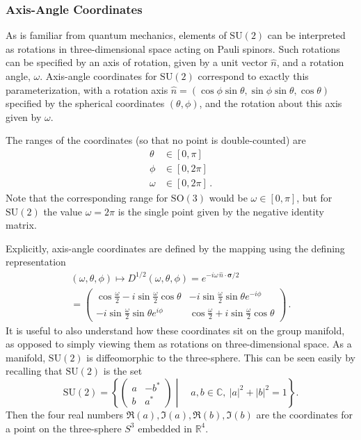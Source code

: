 \documentclass[reprint,superscriptaddress,pra,nofootinbib,preprintnumbers,floatfix]{revtex4-1}
\providecommand{\sutwo}{$\mathrm{SU}(2)$\xspace}
\providecommand{\sothree}{$\mathrm{SO}(3)$\xspace}
\begin{document}
\subsubsection*{Axis-Angle Coordinates}

As is familiar from quantum mechanics, elements of \sutwo can be interpreted as rotations in three-dimensional space acting on Pauli spinors. 
%
Such rotations can be specified by an axis of rotation, given by a unit vector $\hat n$, and a rotation angle, $\omega$. 
%
Axis-angle coordinates for \sutwo correspond to exactly this parameterization, with a rotation axis $\hat{n} = (\cos\phi \sin\theta, \sin\phi\sin\theta, \cos\theta)$ specified by the spherical coordinates $(\theta,\phi)$, and the rotation about this axis given by $\omega$.



The ranges of the coordinates (so that no point is double-counted) are
%
\begin{equation}
\begin{split}
    \theta &\in [0,\pi] \\
    \phi &\in [0,2\pi] \\
    \omega &\in [0,2\pi]
    \,.
\end{split}
\end{equation}
%
Note that the corresponding range for \sothree would be $\omega \in [0,\pi]$, but for \sutwo the value $\omega = 2\pi$ is the single point given by the negative identity matrix. 



Explicitly, axis-angle coordinates are defined by the mapping using the defining representation
%
\begin{multline}
\label{eq:axis_angle}
(\omega,\theta,\phi) \mapsto  D^{1/2}(\omega, \theta, \phi)= e^{-i \omega\, \hat{n}\cdot\bm{\sigma} / 2} \\
= \begin{pmatrix} \cos\frac{\omega}{2} - i\sin\frac{\omega}{2}\cos\theta &-i\sin\frac{\omega}{2} \sin\theta e^{-i\phi} \\[10pt]
-i\sin\frac{\omega}{2} \sin\theta e^{i\phi} &
\cos\frac{\omega}{2} + i\sin\frac{\omega}{2}\cos\theta
\end{pmatrix} \,.
\end{multline}
%
It is useful to also understand how these coordinates sit on the group manifold, as opposed to simply viewing them as rotations on three-dimensional space. 
%
As a manifold, \sutwo is diffeomorphic to the three-sphere. This can be seen easily by recalling that \sutwo is the set
%
\begin{equation}
\mathrm{SU}(2) = \left\{ \begin{pmatrix} a & -b^* \\ b & a^* \end{pmatrix}
\middle\vert \quad a,b\in\mathbb{C}, \ |a|^2 + |b|^2 = 1 \right\}.
\end{equation}
%
Then the four real numbers $\Re(a), \Im(a), \Re(b), \Im(b)$ are the coordinates for a point on the three-sphere $S^3$ embedded in $\mathbb{R}^4$.
\end{document}
